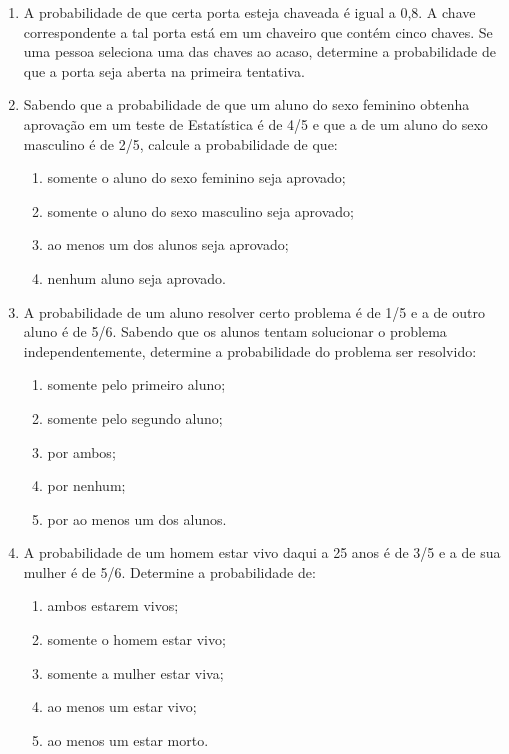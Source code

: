 \begin{enumerate}[resume]
\item A probabilidade de que certa porta esteja chaveada é igual a 0,8. A chave correspondente a tal porta está em um chaveiro que contém cinco chaves. Se uma pessoa seleciona uma das chaves ao acaso, determine a probabilidade de que a porta seja aberta na primeira tentativa.

\item Sabendo que a probabilidade de que um aluno do sexo feminino obtenha aprovação em um teste de Estatística é de 4/5 e que a de um aluno do sexo masculino é de 2/5, calcule a probabilidade de que:
	\begin{enumerate}
	\item somente o aluno do sexo feminino seja aprovado;
	\item somente o aluno do sexo masculino seja aprovado;
	\item ao menos um dos alunos seja aprovado;
	\item nenhum aluno seja aprovado.
	\end{enumerate}
	
\item A probabilidade de um aluno resolver certo problema é de 1/5 e a de outro aluno é de 5/6. Sabendo que os alunos tentam solucionar o problema independentemente, determine a probabilidade do problema ser resolvido:
	\begin{enumerate}
	\item somente pelo primeiro aluno;
	\item somente pelo segundo aluno;
	\item por ambos;
	\item por nenhum;
	\item por ao menos um dos alunos.
	\end{enumerate}
	
\item A probabilidade de um homem estar vivo daqui a 25 anos é de 3/5 e a de sua mulher é de 5/6. Determine a probabilidade de:
	\begin{enumerate}
	\item ambos estarem vivos;
	\item somente o homem estar vivo;
	\item somente a mulher estar viva;
	\item ao menos um estar vivo;
	\item ao menos um estar morto.	
	\end{enumerate}


\end{enumerate}
